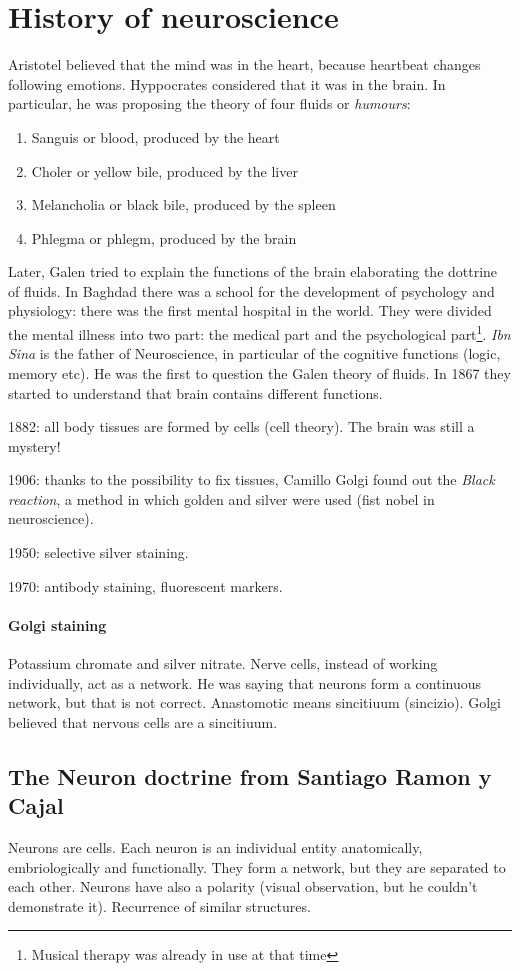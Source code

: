 \documentclass[a4paper, 12pt]{book}
\begin{document}
\section{History of neuroscience}
Aristotel believed that the mind was in the heart, because heartbeat changes following emotions. Hyppocrates considered that it was in the brain. In particular, he was proposing the theory of four fluids or \emph{humours}:
\begin{enumerate}
\item{Sanguis or blood, produced by the heart}
\item{Choler or yellow bile, produced by the liver}
\item{Melancholia or black bile, produced by the
spleen}
\item{Phlegma or phlegm, produced by the brain}
\end{enumerate}
Later, Galen tried to explain the functions of the brain elaborating the dottrine of fluids. In Baghdad there was a school for the development of psychology and physiology: there was the first mental hospital in the world. They were divided the mental illness into two part: the medical part and the psychological part\footnote{Musical therapy was already in use at that time}. \emph{Ibn Sina} is the father of Neuroscience, in particular of the cognitive functions (logic, memory etc). He was the first to question the Galen theory of fluids. In 1867 they started to understand that brain contains different functions.

1882: all body tissues are formed by cells (cell theory).  The brain was still a mystery!

1906: thanks to the possibility to fix tissues, Camillo Golgi found out the \emph{Black reaction}, a method in which golden and silver were used (fist nobel in neuroscience).

1950: selective silver staining.

1970: antibody staining, fluorescent markers.

\paragraph{Golgi staining}
Potassium chromate and silver nitrate. 
Nerve cells, instead of working individually, act as a network. He was saying that neurons form a continuous network, but that is not correct. Anastomotic means sincitiuum (sincizio). Golgi believed that nervous cells are a sincitiuum.

\subsection{The Neuron doctrine from Santiago Ramon y Cajal}
Neurons are cells. Each neuron is an individual entity anatomically, embriologically and functionally. They form a network, but they are separated to each other. Neurons have also a polarity (visual observation, but he couldn't demonstrate it). Recurrence of similar structures.
\end{document}
